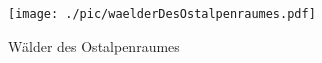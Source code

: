 \documentclass[twocolumn]{scrartcl}
\begin{document}
\begin{landscape}
  \begin{figure}[hp]
    \centering
    \texttt{[image: ./pic/waelderDesOstalpenraumes.pdf]}
    \caption{Wälder des Ostalpenraumes \citep{mayer1977KarteWaldtypen}}
    \label{fig:waelder}
  \end{figure}
\end{landscape}





\end{document}
